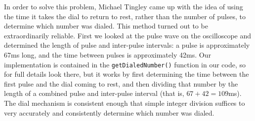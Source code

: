 \documentclass{es50report}
\begin{document}
    In order to solve this problem, Michael Tingley came up with the idea of using the time it takes the dial to return to rest, rather than the number of pulses, to determine which number was dialed. This method turned out to be extraordinarily reliable. First we looked at the pulse wave on the oscilloscope and determined the length of pulse and inter-pulse intervals: a pulse is approximately 67ms long, and the time between pulses is approximately 42ms. Our implementation is contained in the \verb+getDialedNumber()+ function in our code, so for full details look there, but it works by first determining the time between the first pulse and the dial coming to rest, and then dividing that number by the length of a combined pulse and inter-pulse interval (that is, $67 + 42 = 109$ms). The dial mechanism is consistent enough that simple integer division suffices to very accurately and consistently determine which number was dialed.
\end{document}
